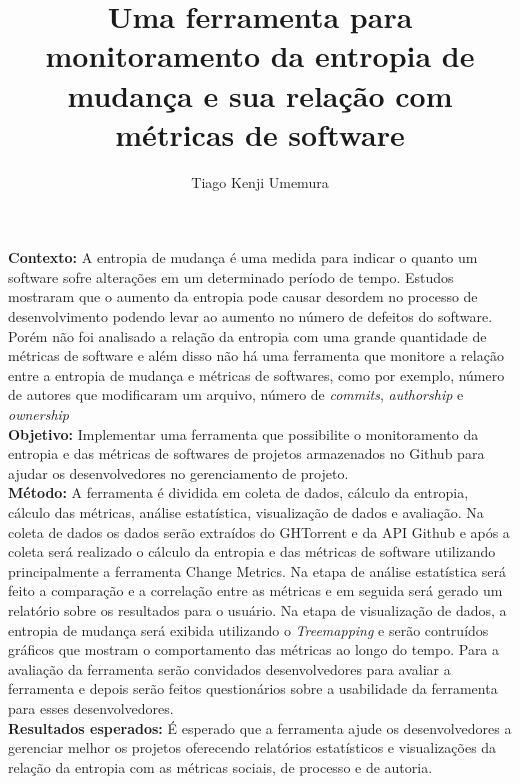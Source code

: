 \documentclass[12pt,english,brazil,a4paper,utf8,oneside]{utfpr-tcc}
\author{Tiago Kenji Umemura}  %
\title{Uma ferramenta para monitoramento da entropia de mudança e sua relação com métricas de software} %
\begin{document}
	
\frontmatter
\maketitle

\begin{resumo}

\textbf{Contexto:} A entropia de mudança é uma medida para indicar o quanto um software sofre alterações em um determinado período de tempo. Estudos mostraram que o aumento da entropia pode causar desordem no processo de desenvolvimento podendo levar ao aumento no número de defeitos do software. Porém não foi analisado a relação da entropia com uma grande quantidade de métricas de software e além disso não há uma ferramenta que monitore a relação entre a entropia de mudança e métricas de softwares, como por exemplo, número de autores que modificaram um arquivo, número de \textit{commits}, \textit{authorship} e \textit{ownership}\\
\textbf{Objetivo:} Implementar uma ferramenta que possibilite o monitoramento da entropia e das métricas de softwares de projetos armazenados no Github para ajudar os desenvolvedores no gerenciamento de projeto. \\
\textbf{Método:} A ferramenta é dividida em coleta de dados, cálculo da entropia, cálculo das métricas, análise estatística, visualização de dados e avaliação.
Na coleta de dados os dados serão extraídos do GHTorrent e da API Github e após a coleta será realizado o cálculo da entropia e das métricas de software utilizando principalmente a ferramenta Change Metrics. Na etapa de análise estatística será feito a comparação e a correlação entre as métricas e em seguida será gerado um relatório sobre os resultados para o usuário. Na etapa de visualização de dados, a entropia de mudança será exibida utilizando o \textit{Treemapping} e serão contruídos gráficos que mostram o comportamento das métricas ao longo do tempo. Para a avaliação da ferramenta serão convidados desenvolvedores para avaliar a ferramenta e depois serão feitos questionários sobre a usabilidade da ferramenta para esses desenvolvedores.\\
\textbf{Resultados esperados:} É esperado que a ferramenta ajude os desenvolvedores a gerenciar melhor os projetos oferecendo relatórios estatísticos e visualizações da relação da entropia com as métricas sociais, de processo e de autoria.

\end{resumo}
\end{document}

